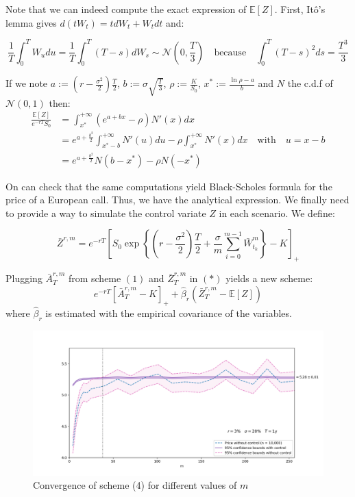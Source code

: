 \documentclass{article}
\begin{document}
Note that we can indeed compute the exact expression of $\mathbb E[Z]$. First, It\^o's lemma
gives $d(tW_t) = tdW_t + W_tdt$ and:

\[
	\frac{1}{T} \int_0^T W_u du = \frac{1}{T} \int_0^T (T-s) dW_s \sim \mathcal N \left(0, \frac{T}{3} \right)
	\quad \text{because} \quad \int_0^T (T-s)^2 ds = \frac{T^3}{3}
\]

If we note $a := \left( r - \frac{\sigma^2}{2} \right) \frac{T}{2}$, $b := \sigma \sqrt{\frac{T}{3}}$, $\rho :=\frac{K}{S_0}$,
$x^\ast := \frac{\ln \rho - a}{b}$ and $N$ the c.d.f of $\mathcal N (0, 1)$ then:
\begin{align*}
	\frac{\mathbb E[Z]}{e^{-rT} S_0}
	&= \int_{x^\ast}^{+ \infty} \left( e^{a + bx} - \rho \right) N'(x) dx \\
	&= e^{a + \frac{b^2}{2}} \int_{x^\ast - b}^{+ \infty} N'(u) du - \rho \int_{x^\ast}^{+ \infty} N'(x) dx
	\quad \text{with} \quad u = x - b \\
	&= e^{a + \frac{b^2}{2}} N(b - x^\ast) - \rho N(-x^\ast)
\end{align*}
	
On can check that the same computations yield Black-Scholes formula for the price of a European call.
Thus, we have the analytical expression. We finally need to provide a way to simulate the control variate $Z$
in each scenario. We define:

\begin{equation}
	\bar Z^{r, m} = e^{-rT} \left[ S_0 \exp \left\{ \left( r - \frac{\sigma^2}{2} \right) \frac{T}{2} +
		\frac{\sigma}{m} \sum_{i=0}^{m-1} \bar W_{t_k}^m \right\} - K \right]_+
	\tag{$i$}
\end{equation}

Plugging $\bar A_T^{r, m}$ from scheme $(1)$ and $\bar Z_T^{r, m}$ in $(\ast)$ yields a new scheme:
\begin{equation}
	e^{-rT} \left[ \bar A_T^{r, m} - K \right]_+ + \hat\beta_r \left( \bar Z_T^{r, m} - \mathbb E [Z] \right)
	\tag{4}
\end{equation}
where $\hat\beta_r$ is estimated with the empirical covariance of the variables.

\begin{figure}[H]
  \hspace*{-0.1\linewidth}\includegraphics[width=1.1\textwidth]{charts/cvgce_control.png}
  \caption{Convergence of scheme (4) for different values of $m$}
\end{figure}
\end{document}
